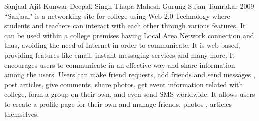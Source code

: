  \begin{conf-abstract}[]
{Sanjaal }
{
Ajit Kunwar
Deepak Singh Thapa
Mahesh Gurung
Sujan Tamrakar
}
{2009}
``Sanjaal" is a networking site for college using Web 2.0 Technology where students and teachers can interact with each other through various features. It can be used within a college premises having Local Area Network connection and thus, avoiding the need of Internet in order to communicate. It is web-based, providing features like email, instant messaging services and many more. It encourages users to communicate in an effective way and share information among the users. Users can make friend requests, add friends and send messages , post articles, give comments, share photos, get event information related with college, form a group on their own, and even send SMS  worldwide. It allows users to create a profile page for their own and manage friends, photos , articles themselves. 
  \end{conf-abstract}